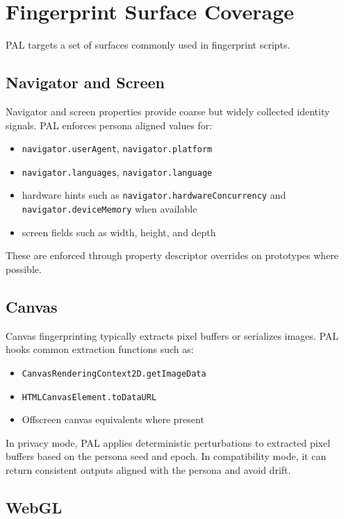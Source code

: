 \documentclass[11pt]{report}
\begin{document}
\section{Fingerprint Surface Coverage}

PAL targets a set of surfaces commonly used in fingerprint scripts.

\subsection{Navigator and Screen}

Navigator and screen properties provide coarse but widely collected identity signals. PAL enforces persona aligned values for:

\begin{itemize}
    \item \texttt{navigator.userAgent}, \texttt{navigator.platform}
    \item \texttt{navigator.languages}, \texttt{navigator.language}
    \item hardware hints such as \texttt{navigator.hardwareConcurrency} and \texttt{navigator.deviceMemory} when available
    \item screen fields such as width, height, and depth
\end{itemize}

These are enforced through property descriptor overrides on prototypes where possible.

\subsection{Canvas}

Canvas fingerprinting typically extracts pixel buffers or serializes images. PAL hooks common extraction functions such as:

\begin{itemize}
    \item \texttt{CanvasRenderingContext2D.getImageData}
    \item \texttt{HTMLCanvasElement.toDataURL}
    \item Offscreen canvas equivalents where present
\end{itemize}

In privacy mode, PAL applies deterministic perturbations to extracted pixel buffers based on the persona seed and epoch. In compatibility mode, it can return consistent outputs aligned with the persona and avoid drift.

\subsection{WebGL}
\end{document}

